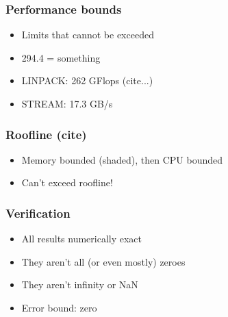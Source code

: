 \documentclass{beamer}
\begin{document}
\begin{frame}
\frametitle{Performance bounds}

\begin{itemize}
	\item Limits that cannot be exceeded
	\item 294.4 = something
	\item LINPACK: 262 GFlops (cite...)
	\item STREAM: 17.3 GB/s
\end{itemize}
\end{frame}



\begin{frame}
\frametitle{Roofline (cite)}

\begin{center}
\end{center}

\begin{itemize}
	\item Memory bounded (shaded), then CPU bounded
	\item Can't exceed roofline!
\end{itemize}
\end{frame}



\begin{frame}
\frametitle{Verification}

\begin{itemize}
	\item All results numerically exact \Smiley
	\item They aren't all (or even mostly) zeroes
	\item They aren't infinity or NaN
	\item Error bound: zero
\end{itemize}
\end{frame}
\end{document}
